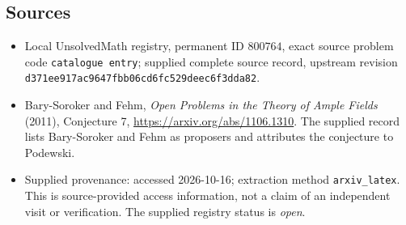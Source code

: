 \documentclass[11pt]{article}
\begin{document}
\subsection{Sources}
\begin{itemize}
\item Local UnsolvedMath registry, permanent ID \(800764\), exact source problem code \texttt{catalogue entry}; supplied complete source record, upstream revision \texttt{d371ee917ac9647fbb06cd6fc529deec6f3dda82}.
\item Bary-Soroker and Fehm, \emph{Open Problems in the Theory of Ample Fields} (2011), Conjecture 7, \url{https://arxiv.org/abs/1106.1310}. The supplied record lists Bary-Soroker and Fehm as proposers and attributes the conjecture to Podewski.
\item Supplied provenance: accessed 2026-10-16; extraction method \texttt{arxiv\_latex}. This is source-provided access information, not a claim of an independent visit or verification. The supplied registry status is \emph{open}.
\end{itemize}
\end{document}
